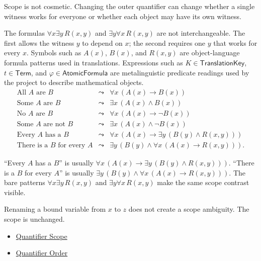 \begin{remark*}[Interpretation]
Scope is not cosmetic. Changing the outer quantifier can change whether a
single witness works for everyone or whether each object may have its own
witness.
\end{remark*}

\begin{remark*}[Exposition]
The formulas \(\forall x\exists y\,R(x,y)\) and
\(\exists y\forall x\,R(x,y)\) are not interchangeable. The first allows the
witness \(y\) to depend on \(x\); the second requires one \(y\) that works for
every \(x\). Symbols such as \(A(x)\), \(B(x)\), and \(R(x,y)\) are
object-language formula patterns used in translations. Expressions such as
\(K\in\mathsf{TranslationKey}\), \(t\in\mathsf{Term}\), and
\(\varphi\in\mathsf{AtomicFormula}\) are metalinguistic predicate readings
used by the project to describe mathematical objects.
\[
\begin{array}{lll}
\text{All }A\text{ are }B
  &\leadsto& \forall x\,(A(x)\to B(x))\\
\text{Some }A\text{ are }B
  &\leadsto& \exists x\,(A(x)\land B(x))\\
\text{No }A\text{ are }B
  &\leadsto& \forall x\,(A(x)\to \neg B(x))\\
\text{Some }A\text{ are not }B
  &\leadsto& \exists x\,(A(x)\land \neg B(x))\\
\text{Every }A\text{ has a }B
  &\leadsto& \forall x\,(A(x)\to \exists y\,(B(y)\land R(x,y)))\\
\text{There is a }B\text{ for every }A
  &\leadsto& \exists y\,(B(y)\land \forall x\,(A(x)\to R(x,y))).
\end{array}
\]
\end{remark*}

\begin{remark*}[Examples]
``Every \(A\) has a \(B\)'' is usually
\(\forall x\,(A(x)\to \exists y\,(B(y)\land R(x,y)))\). ``There is a \(B\) for
every \(A\)'' is usually
\(\exists y\,(B(y)\land \forall x\,(A(x)\to R(x,y)))\). The bare patterns
\(\forall x\exists y\,R(x,y)\) and \(\exists y\forall x\,R(x,y)\) make the same
scope contrast visible.
\end{remark*}

\begin{remark*}
Renaming a bound variable from \(x\) to \(z\) does not create a scope ambiguity.
The scope is unchanged.
\end{remark*}

\begin{dependencies}
\begin{itemize}
  \item \hyperref[def:quantifier-scope]{Quantifier Scope}
  \item \hyperref[def:q-alt]{Quantifier Order}
\end{itemize}
\end{dependencies}
